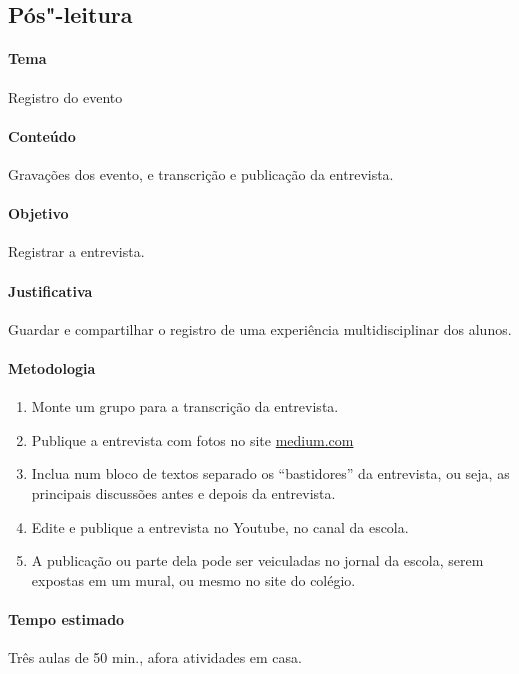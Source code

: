 \documentclass[12pt]{extarticle}
\begin{document}


\subsection{Pós"-leitura}

\paragraph{Tema} Registro do evento

\paragraph{Conteúdo} Gravações dos evento, e transcrição e publicação da entrevista. 

\paragraph{Objetivo} Registrar a entrevista. 

\paragraph{Justificativa} Guardar e compartilhar o registro de uma experiência multidisciplinar 
	dos alunos. 

\paragraph{Metodologia}
	\begin{enumerate}
		\item Monte um grupo para a transcrição da entrevista. 

		\item Publique a entrevista com fotos no site \href{https://medium.com/}{medium.com}
		\item Inclua num bloco de textos separado os ``bastidores'' da entrevista, ou seja, 
		as principais discussões antes e depois da entrevista. 
		\item Edite e publique a entrevista no Youtube, no canal da escola. 
		\item A publicação ou parte dela pode ser veiculadas no jornal da escola,
		serem expostas em um mural, ou mesmo no site do colégio.
	\end{enumerate}

\paragraph{Tempo estimado} Três aulas de 50 min., afora atividades em casa. 
\end{document}
